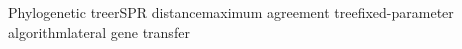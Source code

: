 
\begin{Eabstract}{Phylogenetic tree}{rSPR distance}{maximum agreement tree}{fixed-parameter algorithm}{lateral gene transfer}

\end{Eabstract}
